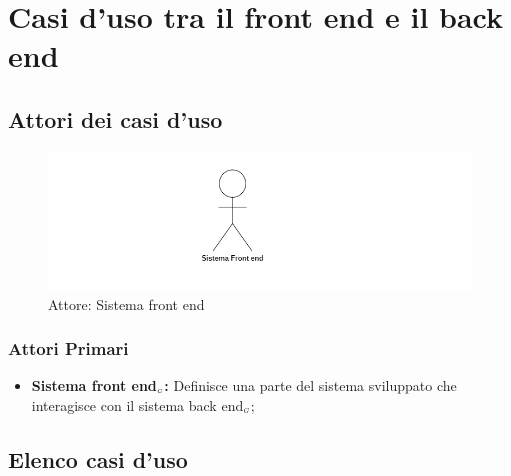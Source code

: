 \section{Casi d'uso tra il front end e il back end}\label{CasiDUsoCasiDUsoTraIlFrontEndEIlBackEnd}

\subsection{Attori dei casi d'uso}\label{CasiDUsoCasiDUsoTraIlFrontEndEIlBackEndAttoriDeiCasiDUso}
\begin{center}
	\begin{figure}[H]
		\centering\includegraphics{../immagini/attori_casi/sistema_front_end.png}
		\caption{Attore: Sistema front end}
	\end{figure}
\end{center}
\subsubsection{Attori Primari}\label{CasiDUsoCasiDUsoTraIlFrontEndEIlBackEndAttoriDeiCasiDUsoAttoriPrimari}
\begin{itemize}
	\item \textbf{Sistema front end$_{\scaleto{G}{3pt}}$:} Definisce una parte del sistema sviluppato che interagisce con il sistema back end$_{\scaleto{G}{3pt}}$;
\end{itemize}

\subsection{Elenco casi d'uso}\label{CasiDUsoCasiDUsoTraIlFrontEndEIlBackEndElencoDeiCasiDUso}

